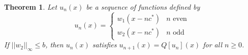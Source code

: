 \documentclass[11pt]{article}
\newtheorem{thm}{Theorem}
\newtheorem{lem}[thm]{Lemma}
\theoremstyle{definition}
\numberwithin{equation}{section}
\numberwithin{thm}{section}
\renewcommand{\a}{a}
\renewcommand{\b}{b}
\newcommand{\m}{n_1}
\begin{document}
%
%



\begin{thm} \label{theorem1}
Let $u_n(x)$ be a sequence of functions defined by
\begin{equation}
u_n(x) = \begin{cases} \label{ptw}
w_1(x-nc^*) & n \text{ even} \\
w_2(x-nc^*) & n \text{ odd}
\end{cases} \end{equation}
If $|| w_2 ||_\infty \leq \b $, then $u_n(x)$ satisfies $u_{n+1}(x) = Q[u_n](x)$ for all $n\geq 0$.
\end{thm}
\end{document}
